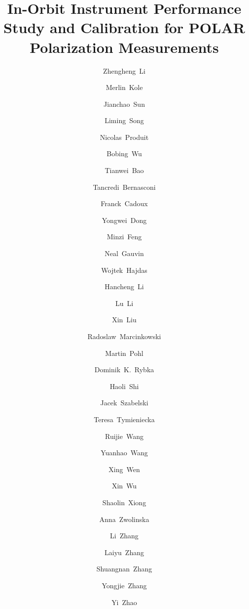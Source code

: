 \documentclass[preprint,sort&compress,12pt]{elsarticle}
\begin{document}
\begin{frontmatter}
\title{In-Orbit Instrument Performance Study and Calibration for POLAR Polarization Measurements}

\author[a1,a2]{Zhengheng~Li}
\author[a3]{Merlin~Kole}
\author[a1]{Jianchao~Sun}
\author[a1]{Liming~Song}
\author[a4]{Nicolas~Produit}
\author[a1]{Bobing~Wu}

\author[a1]{Tianwei~Bao}
\author[a4]{Tancredi~Bernasconi}
\author[a3]{Franck~Cadoux}
\author[a1]{Yongwei~Dong}
\author[a1,a2]{Minzi~Feng}
\author[a4]{Neal~Gauvin}
\author[a5]{Wojtek~Hajdas}
\author[a1,a2]{Hancheng~Li}
\author[a1]{Lu~Li}
\author[a1,a2]{Xin~Liu}
\author[a5]{Radoslaw~Marcinkowski}
\author[a3]{Martin~Pohl}
\author[a6]{Dominik~K.~Rybka}
\author[a1]{Haoli~Shi}
\author[a6]{Jacek~Szabelski}
\author[a6]{Teresa~Tymieniecka}
\author[a1]{Ruijie~Wang}
\author[a1,a2]{Yuanhao~Wang}
\author[a1,a2]{Xing~Wen}
\author[a3]{Xin~Wu}
\author[a1]{Shaolin~Xiong}
\author[a6]{Anna~Zwolinska}
\author[a1]{Li~Zhang}
\author[a1]{Laiyu~Zhang}
\author[a1]{Shuangnan~Zhang}
\author[a1]{Yongjie~Zhang}
\author[a1,a7]{Yi~Zhao}

\address[a1]{Key Laboratory of Particle Astrophysics, Institute of High Energy Physics, Chinese Academy of Sciences, Beijing 100049, China}
\address[a2]{University of Chinese Academy of Sciences, Beijing 100049, China}
\address[a3]{University of Geneva (DPNC), quai Ernest-Ansermet 24, 1205 Geneva, Switzerland}
\address[a4]{University of Geneva, Geneva Observatory, ISDC, 16, Chemin d'Ecogia, 1290 Versoix, Switzerland}
\address[a5]{Paul Scherrer Institut, 5232 Villigen PSI, Switzerland}
\address[a6]{National Centre for Nuclear Research, ul. A. Soltana 7, 05-400 Otwock, Swierk, Poland}
\address[a7]{School of Nuclear Science and Technology, Lanzhou University, Lanzhou 730000, China}



\end{frontmatter}
\end{document}
